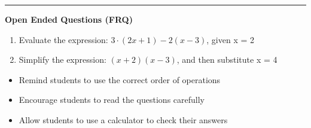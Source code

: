 \documentclass[10pt]{article}
\begin{document}
\vspace{-0.2cm}
\hrule
\vspace{0.2cm}
\textbf{\small Open Ended Questions (FRQ)}
\begin{enumerate}[label=\textbf{Q\arabic*.}, start=9, itemsep=5pt, topsep=0pt]

  \item \small Evaluate the expression: $3 \cdot (2x + 1) - 2(x - 3)$, given x = 2 \vspace{2cm}

  \item \small Simplify the expression: $(x + 2)(x - 3)$, and then substitute x = 4 \vspace{2cm}

\end{enumerate}

\vfill

\begin{tcolorbox}[colback=blue!5, colframe=mainblue!50, title=\small \textbf{Chef's Tips}, fonttitle=\bfseries, bottom=1mm]
\begin{itemize}[noitemsep, topsep=2pt, leftmargin=0.5cm]
  \item \scriptsize Remind students to use the correct order of operations\item \scriptsize Encourage students to read the questions carefully\item \scriptsize Allow students to use a calculator to check their answers
\end{itemize}
\end{tcolorbox}
\end{document}
